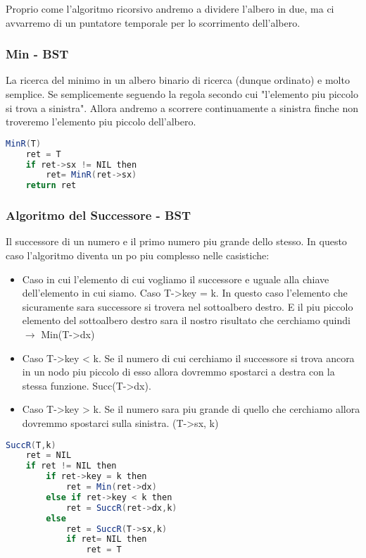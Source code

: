 Proprio come l'algoritmo ricorsivo andremo a dividere l'albero in due, ma ci avvarremo di un puntatore temporale per lo scorrimento dell'albero.

\subsubsection{Min - BST}
La ricerca del minimo in un albero binario di ricerca (dunque ordinato) e molto semplice. Se semplicemente seguendo la regola secondo cui "l'elemento piu piccolo si trova a sinistra". Allora andremo a scorrere continuamente a sinistra finche non troveremo l'elemento piu piccolo dell'albero.

\begin{lstlisting}[language=Java]
	MinR(T)
	ret = T
	if ret->sx != NIL then
		ret= MinR(ret->sx)
	return ret
\end{lstlisting}

\subsubsection{Algoritmo del Successore - BST}
Il successore di un numero e il primo numero piu grande dello stesso. In questo caso l'algoritmo diventa un po piu complesso nelle casistiche:
\begin{itemize}
	\item  Caso in cui l'elemento di cui vogliamo il successore e uguale alla chiave dell'elemento in cui siamo. Caso T->key = k. In questo caso l'elemento che sicuramente sara successore si trovera nel sottoalbero destro. E il piu piccolo elemento del sottoalbero destro sara il nostro risultato che cerchiamo quindi $\rightarrow$ Min(T->dx)
	\item Caso T->key < k. Se il numero di cui cerchiamo il successore si trova ancora in un nodo piu piccolo di esso allora dovremmo spostarci a destra con la stessa funzione. Succ(T->dx).
	\item Caso T->key > k. Se il numero sara piu grande di quello che cerchiamo allora dovremmo spostarci sulla sinistra. (T->sx, k)
\end{itemize}

\begin{lstlisting}[language=Java]
	SuccR(T,k)
	ret = NIL
	if ret != NIL then
		if ret->key = k then
			ret = Min(ret->dx)
		else if ret->key < k then
			ret = SuccR(ret->dx,k)
		else 
			ret = SuccR(T->sx,k)
			if ret= NIL then
				ret = T
\end{lstlisting}

